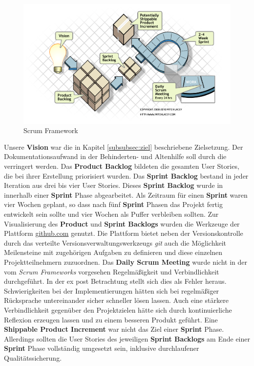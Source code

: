 \begin{figure}[htp]
	\includegraphics[width=\textwidth]{ScrumFrameworkFlow}
	\caption{Scrum Framework}
	\label{ScrumFramework}
\end{figure}

Unsere \textbf{Vision} war die in Kapitel \ref{subsubsec:ziel} beschriebene Zielsetzung. Der Dokumentationsaufwand in der Behinderten- und Altenhilfe
soll durch die \EBP verringert werden. Das \textbf{Product Backlog} bildeten die gesamten User Stories, die bei ihrer Erstellung priorisiert wurden.
Das \textbf{Sprint Backlog} bestand in jeder Iteration aus drei bis vier User Stories. Dieses \textbf{Sprint Backlog} wurde in innerhalb einer
\textbf{Sprint} Phase abgearbeitet. Als Zeitraum für einen \textbf{Sprint} waren vier Wochen geplant, so dass nach fünf \textbf{Sprint} Phasen das
Projekt fertig entwickelt sein sollte und vier Wochen als Puffer verbleiben sollten. Zur Visualisierung des \textbf{Product} und \textbf{Sprint
Backlogs} wurden die Werkzeuge der Plattform \url{github.com} genutzt. Die Plattform bietet neben der Versionskontrolle durch das verteilte
Versionsverwaltungswerkzeugs \textit{git} auch die Möglichkeit Meilensteine mit zugehörigen Aufgaben zu definieren und diese einzelnen
Projektteilnehmern zuzuordnen. Das \textbf{Daily Scrum Meeting} wurde nicht in der vom \textit{Scrum Frameworks} vorgesehen Regelmäßigkeit und
Verbindlichkeit durchgeführt. In der ex post Betrachtung stellt sich dies als Fehler heraus. Schwierigkeiten bei der Implementierungen hätten sich
bei regelmäßiger Rücksprache untereinander sicher schneller lösen lassen. Auch eine stärkere Verbindlichkeit gegenüber den Projektzielen hätte sich
durch kontinuierliche Reflexion erzeugen lassen und zu einem besseren Produkt geführt. Eine \textbf{Shippable Product Increment} war nicht das Ziel
einer \textbf{Sprint} Phase. Allerdings sollten die User Stories des jeweiligen \textbf{Sprint Backlogs} am Ende einer \textbf{Sprint} Phase
vollständig umgesetzt sein, inklusive durchlaufener Qualitätssicherung.  
